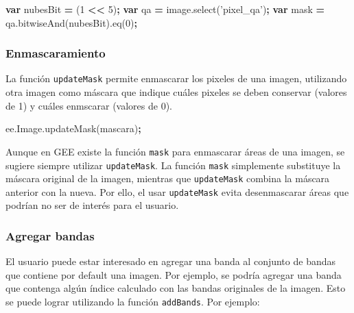 \documentclass[
]{article}
\newenvironment{Shaded}{\begin{snugshade}}{\end{snugshade}}
\newcommand{\AttributeTok}[1]{\textcolor[rgb]{0.77,0.63,0.00}{#1}}
\newcommand{\DecValTok}[1]{\textcolor[rgb]{0.00,0.00,0.81}{#1}}
\newcommand{\KeywordTok}[1]{\textcolor[rgb]{0.13,0.29,0.53}{\textbf{#1}}}
\newcommand{\NormalTok}[1]{#1}
\newcommand{\OperatorTok}[1]{\textcolor[rgb]{0.81,0.36,0.00}{\textbf{#1}}}
\newcommand{\StringTok}[1]{\textcolor[rgb]{0.31,0.60,0.02}{#1}}
\newcommand{\VariableTok}[1]{\textcolor[rgb]{0.00,0.00,0.00}{#1}}
\begin{document}
\begin{Shaded}
\begin{Highlighting}[]
\KeywordTok{var}\NormalTok{ nubesBit }\OperatorTok{=}\NormalTok{ (}\DecValTok{1} \OperatorTok{<<} \DecValTok{5}\NormalTok{)}\OperatorTok{;}
\KeywordTok{var}\NormalTok{ qa }\OperatorTok{=} \VariableTok{image}\NormalTok{.}\AttributeTok{select}\NormalTok{(}\StringTok{'pixel_qa'}\NormalTok{)}\OperatorTok{;}
\KeywordTok{var}\NormalTok{ mask }\OperatorTok{=} \VariableTok{qa}\NormalTok{.}\AttributeTok{bitwiseAnd}\NormalTok{(nubesBit).}\AttributeTok{eq}\NormalTok{(}\DecValTok{0}\NormalTok{)}\OperatorTok{;}
\end{Highlighting}
\end{Shaded}

\hypertarget{enmascaramiento}{%
\subsubsection{Enmascaramiento}\label{enmascaramiento}}

La función \texttt{updateMask} permite enmascarar los pixeles de una
imagen, utilizando otra imagen como máscara que indique cuáles pixeles
se deben conservar (valores de 1) y cuáles enmscarar (valores de 0).

\begin{Shaded}
\begin{Highlighting}[]
\VariableTok{ee}\NormalTok{.}\VariableTok{Image}\NormalTok{.}\AttributeTok{updateMask}\NormalTok{(mascara)}\OperatorTok{;}
\end{Highlighting}
\end{Shaded}

\begin{tipblock}
Aunque en GEE existe la función \texttt{mask} para enmascarar áreas de
una imagen, se sugiere siempre utilizar \texttt{updateMask}. La función
\texttt{mask} simplemente substituye la máscara original de la imagen,
mientras que \texttt{updateMask} combina la máscara anterior con la
nueva. Por ello, el usar \texttt{updateMask} evita desenmascarar áreas
que podrían no ser de interés para el usuario.

\end{tipblock}

\hypertarget{agregar-bandas}{%
\subsubsection{Agregar bandas}\label{agregar-bandas}}

El usuario puede estar interesado en agregar una banda al conjunto de
bandas que contiene por default una imagen. Por ejemplo, se podría
agregar una banda que contenga algún índice calculado con las bandas
originales de la imagen. Esto se puede lograr utilizando la función
\texttt{addBands}. Por ejemplo:
\end{document}
